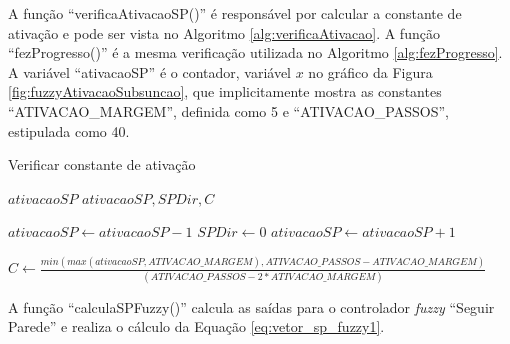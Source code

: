 	A função ``verificaAtivacaoSP()'' é responsável por calcular a constante de ativação e pode
	ser vista no Algoritmo \ref{alg:verificaAtivacao}. A função ``fezProgresso()'' é a mesma
	verificação utilizada no Algoritmo \ref{alg:fezProgresso}. A variável ``ativacaoSP'' é o
	contador, variável $x$ no gráfico da Figura \ref{fig:fuzzyAtivacaoSubsuncao}, que	
	implicitamente mostra as constantes ``ATIVACAO\_MARGEM'', definida como 5 e 
	``ATIVACAO\_PASSOS'', estipulada como 40.
	\begin{algorithm}
		\caption{Verificar constante de ativação}
		\label{alg:verificaAtivacao}%
		\begin{algorithmic}[1]
	
		\REQUIRE $ativacaoSP$
		\ENSURE $ativacaoSP, SPDir, C$
		
				\STATE $ativacaoSP \leftarrow ativacaoSP - 1$
			\ENDIF
				\STATE $SPDir \leftarrow 0$
			\ENDIF
		\ELSE
				\STATE $ativacaoSP \leftarrow ativacaoSP + 1$
			\ENDIF
		\ENDIF
		
		\STATE $C \leftarrow \frac{min(max(ativacaoSP, ATIVACAO\_MARGEM), ATIVACAO\_PASSOS-ATIVACAO\_MARGEM)}{(ATIVACAO\_PASSOS - 2*ATIVACAO\_MARGEM)}$
		
		\end{algorithmic}
	\end{algorithm}
	
	A função ``calculaSPFuzzy()'' calcula as saídas para o controlador \textit{fuzzy} ``Seguir
	Parede'' e realiza o cálculo da Equação \ref{eq:vetor_sp_fuzzy1}. 
	
